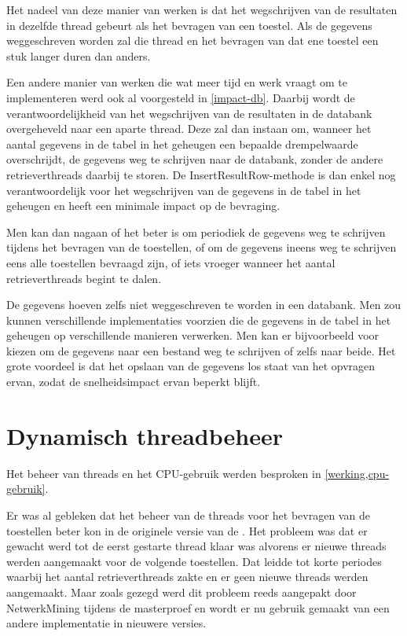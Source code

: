 Het nadeel van deze manier van werken is dat het wegschrijven van de resultaten in dezelfde thread gebeurt als het bevragen van een toestel.
Als de gegevens weggeschreven worden zal die thread en het bevragen van dat ene toestel een stuk langer duren dan anders.

Een andere manier van werken die wat meer tijd en werk vraagt om te implementeren werd ook al voorgesteld in \cref{impact-db}.
Daarbij wordt de verantwoordelijkheid van het wegschrijven van de resultaten in de databank overgeheveld naar een aparte thread.
Deze zal dan instaan om, wanneer het aantal gegevens in de tabel in het geheugen een bepaalde drempelwaarde overschrijdt,
de gegevens weg te schrijven naar de databank, zonder de andere retrieverthreads daarbij te storen.
De InsertResultRow-methode is dan enkel nog verantwoordelijk voor het wegschrijven van de gegevens in de tabel in het geheugen en heeft een minimale impact op de bevraging.

Men kan dan nagaan of het beter is om periodiek de gegevens weg te schrijven tijdens het bevragen van de toestellen,
of om de gegevens ineens weg te schrijven eens alle toestellen bevraagd zijn, of iets vroeger wanneer het aantal retrieverthreads begint te dalen.

De gegevens hoeven zelfs niet weggeschreven te worden in een databank.
Men zou kunnen verschillende implementaties voorzien die de gegevens in de tabel in het geheugen op verschillende manieren verwerken.
Men kan er bijvoorbeeld voor kiezen om de gegevens naar een bestand weg te schrijven of zelfs naar beide.
Het grote voordeel is dat het opslaan van de gegevens los staat van het opvragen ervan, zodat de snelheidsimpact ervan beperkt blijft.


\section{Dynamisch threadbeheer}

Het beheer van threads en het CPU-gebruik werden besproken in \cref{werking,cpu-gebruik}.

Er was al gebleken dat het beheer van de threads voor het bevragen van de toestellen beter kon in de originele versie van de \nwmretriever{}.
Het probleem was dat er gewacht werd tot de eerst gestarte thread klaar was alvorens er nieuwe threads werden aangemaakt voor de volgende toestellen.
Dat leidde tot korte periodes waarbij het aantal retrieverthreads zakte en er geen nieuwe threads werden aangemaakt.
Maar zoals gezegd werd dit probleem reeds aangepakt door NetwerkMining tijdens de masterproef en
wordt er nu gebruik gemaakt van een andere implementatie in nieuwere versies.

